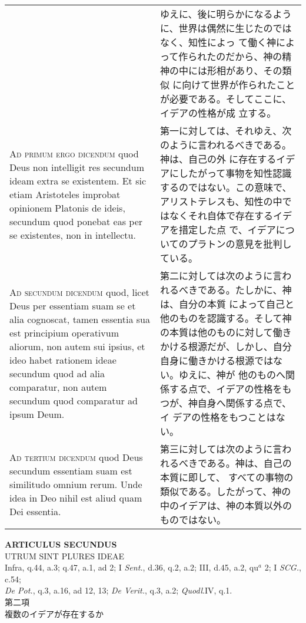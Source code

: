 \documentclass[10pt]{jsarticle} %
\begin{document}
\begin{longtable}{p{21em}p{21em}}
&

ゆえに、後に明らかになるように、世界は偶然に生じたのではなく、知性によっ
て働く神によって作られたのだから、神の精神の中には形相があり、その類似
に向けて世界が作られたことが必要である。そしてここに、イデアの性格が成
立する。

\\


{\scshape Ad primum ergo dicendum} quod Deus non intelligit res
secundum ideam extra se existentem. Et sic etiam Aristoteles improbat
opinionem Platonis de ideis, secundum quod ponebat eas per se
existentes, non in intellectu.

&

第一に対しては、それゆえ、次のように言われるべきである。神は、自己の外
に存在するイデアにしたがって事物を知性認識するのではない。この意味で、
アリストテレスも、知性の中ではなくそれ自体で存在するイデアを措定した点
で、イデアについてのプラトンの意見を批判している。

\\


{\scshape Ad secundum dicendum} quod, licet Deus per essentiam suam se
et alia cognoscat, tamen essentia sua est principium operativum
aliorum, non autem sui ipsius, et ideo habet rationem ideae secundum
quod ad alia comparatur, non autem secundum quod comparatur ad ipsum
Deum.

&

第二に対しては次のように言われるべきである。たしかに、神は、自分の本質
によって自己と他のものを認識する。そして神の本質は他のものに対して働き
かける根源だが、しかし、自分自身に働きかける根源ではない。ゆえに、神が
他のものへ関係する点で、イデアの性格をもつが、神自身へ関係する点で、イ
デアの性格をもつことはない。

\\


{\scshape Ad tertium dicendum} quod Deus secundum essentiam suam est
similitudo omnium rerum. Unde idea in Deo nihil est aliud quam Dei
essentia.

&

 第三に対しては次のように言われるべきである。神は、自己の本質に即して、
すべての事物の類似である。したがって、神の中のイデアは、神の本質以外の
ものではない。

\end{longtable}
\newpage


\begin{center}
 {\Large {\bf ARTICULUS SECUNDUS}}\\
 {\large UTRUM SINT PLURES IDEAE}\\
 {\footnotesize Infra, q.44, a.3; q.47, a.1, ad 2; I {\itshape
 Sent.}, d.36, q.2, a.2; III, d.45, a.2, qu$^a$ 2; I {\itshape
 SCG.}, c.54; \\{\itshape De Pot.}, q.3, a.16, ad 12, 13; {\itshape De
 Verit.}, q.3, a.2; {\itshape Quodl}.IV, q.1.}\\
 {\Large 第二項\\複数のイデアが存在するか}
\end{center}
\end{document}
